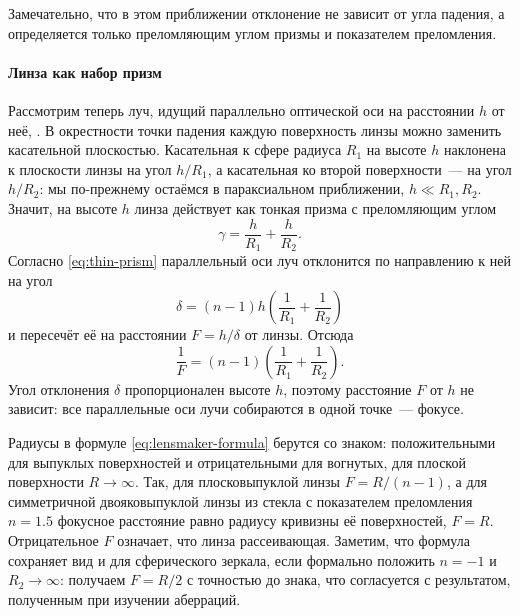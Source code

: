 Замечательно, что в этом приближении отклонение не зависит от угла падения, а определяется только преломляющим углом призмы и показателем преломления.

\paragraph{Линза как набор призм} Рассмотрим теперь луч, идущий параллельно оптической оси на расстоянии $h$ от неё, . В окрестности точки падения каждую поверхность линзы можно заменить касательной плоскостью. Касательная к сфере радиуса $R_1$ на высоте $h$ наклонена к плоскости линзы на угол $h / R_1$, а касательная ко второй поверхности~--- на угол $h / R_2$: мы по-прежнему остаёмся в параксиальном приближении, $h \ll R_1, R_2$. Значит, на высоте $h$ линза действует как тонкая призма с преломляющим углом
\begin{equation*}
    \gamma = \frac{h}{R_1} + \frac{h}{R_2}.
\end{equation*}
Согласно \eqref{eq:thin-prism} параллельный оси луч отклонится по направлению к ней на угол
\begin{equation*}
    \delta = (n - 1) h \left(\frac{1}{R_1} + \frac{1}{R_2}\right)
\end{equation*}
и пересечёт её на расстоянии $F = h / \delta$ от линзы. Отсюда
\begin{equation}
    \frac{1}{F} = (n - 1) \left(\frac{1}{R_1} + \frac{1}{R_2}\right).
    \label{eq:lensmaker-formula}
\end{equation}
Угол отклонения $\delta$ пропорционален высоте $h$, поэтому расстояние $F$ от $h$ не зависит: все параллельные оси лучи собираются в одной точке~--- фокусе. 

Радиусы в формуле \eqref{eq:lensmaker-formula} берутся со знаком: положительными для выпуклых поверхностей и отрицательными для вогнутых, для плоской поверхности $R \to \infty$. Так, для плосковыпуклой линзы $F = R / (n - 1)$, а для симметричной двояковыпуклой линзы из стекла с показателем преломления $n = 1.5$ фокусное расстояние равно радиусу кривизны её поверхностей, $F = R$. Отрицательное $F$ означает, что линза рассеивающая. Заметим, что формула сохраняет вид и для сферического зеркала, если формально положить $n = -1$ и $R_2 \to \infty$: получаем $F = R / 2$ с точностью до знака, что согласуется с результатом, полученным при изучении аберраций.
